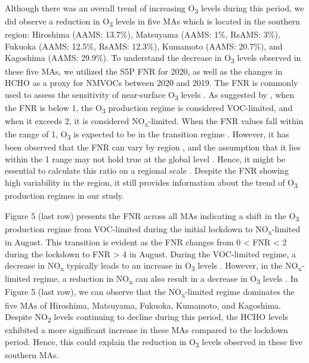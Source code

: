 Although there was an overall trend of increasing O\textsubscript{3} levels during this period, we did observe a reduction in O\textsubscript{3} levels in five MAs which is located in the southern region: Hiroshima (AAMS: 13.7\%), Matsuyama (AAMS: 1\%, RsAMS: 3\%), Fukuoka (AAMS: 12.5\%, RsAMS: 12.3\%), Kumamoto (AAMS: 20.7\%), and Kagoshima (AAMS: 29.9\%). To understand the decrease in O\textsubscript{3} levels observed in these five MAs, we utilized the S5P FNR for 2020, as well as the changes in HCHO as a proxy for NMVOCs between 2020 and 2019. The FNR is commonly used to assess the sensitivity of near-surface O\textsubscript{3} levels \citep{martin2004space}. As suggested by \citep{duncan2010application}, when the FNR is below 1, the O\textsubscript{3} production regime is considered VOC-limited, and when it exceeds 2, it is considered NO\textsubscript{x}-limited. When the FNR values fall within the range of 1, O\textsubscript{3} is expected to be in the transition regime \citep{duncan2010application}. However, it has been observed that the FNR can vary by region \citep{jin2020inferring,irie2021continuous,souri2023characterization,ren2022diagnosing}, and the assumption that it lies within the 1 range may not hold true at the global level \citep{schroeder2017new}. Hence, it might be essential to calculate this ratio on a regional scale \citep{damiani2022peculiar,schroeder2017new}. Despite the FNR showing high variability in the region, it still provides information about the trend of O\textsubscript{3} production regimes in our study. \par
Figure 5 (last row) presents the FNR across all MAs indicating a shift in the O\textsubscript{3} production regime from VOC-limited during the initial lockdown to NO\textsubscript{x}-limited in August. This transition is evident as the FNR changes from 0 < FNR < 2 during the lockdown to FNR > 4 in August. During the VOC-limited regime, a decrease in NO\textsubscript{x} typically leads to an increase in O\textsubscript{3} levels \citep{duncan2010application}. However, in the NO\textsubscript{x}-limited regime, a reduction in NO\textsubscript{x} can also result in a decrease in O\textsubscript{3} levels \citep{duncan2010application}. In Figure 5 (last row), we can observe that the NO\textsubscript{x}-limited regime dominates the five MAs of Hiroshima, Matsuyama, Fukuoka, Kumamoto, and Kagoshima. Despite NO\textsubscript{2} levels continuing to decline during this period, the HCHO levels exhibited a more significant increase in these MAs compared to the lockdown period. Hence, this could explain the reduction in O\textsubscript{3} levels observed in these five southern MAs. \par
